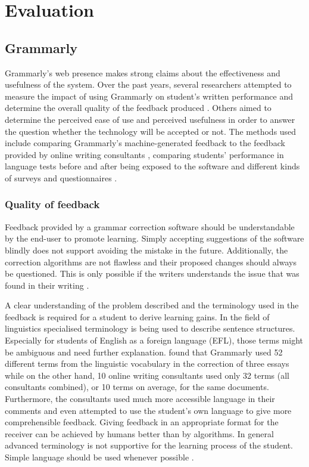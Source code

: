 \documentclass[runningheads]{llncs}
\let\OldTextregistered\textregistered
\renewcommand{\textregistered}{\OldTextregistered\xspace}%
\begin{document}
\section{Evaluation}

\subsection{Grammarly\textregistered}
Grammarly\textregistered's web presence \citep{noauthor_write_nodate} makes strong claims about the effectiveness and usefulness of the system. Over the past years, several researchers attempted to measure the impact of using Grammarly\textregistered on student's written performance and determine the overall quality of the feedback produced \citep{dembsey_closing_2017,nova_utilizing_2018,ventayen_graduate_2018}. Others \citep{cavaleri_you_2016} aimed to determine the perceived ease of use and perceived usefulness in order to answer the question whether the technology will be accepted or not. The methods used include comparing Grammarly\textregistered's machine-generated feedback to the feedback provided by online writing consultants \citep{dembsey_closing_2017}, comparing students' performance in language tests before and after being exposed to the software \citep{qassemzadeh_impact_2016} and different kinds of surveys and questionnaires \citep{nova_utilizing_2018, cavaleri_you_2016, ventayen_graduate_2018}.

\subsubsection{Quality of feedback}
Feedback provided by a grammar correction software should be understandable by the end-user to promote learning. Simply accepting suggestions of the software blindly does not support avoiding the mistake in the future. Additionally, the correction algorithms are not flawless and their proposed changes should always be questioned. This is only possible if the writers understands the issue that was found in their writing \citep{dembsey_closing_2017}.

A clear understanding of the problem described and the terminology used in the feedback is required for a student to derive learning gains. In the field of linguistics specialised terminology is being used to describe sentence structures. Especially for students of English as a foreign language (EFL), those terms might be ambiguous and need further explanation. \textcite{dembsey_closing_2017} found that Grammarly\textregistered used 52 different terms from the linguistic vocabulary in the correction of three essays while on the other hand, 10 online writing consultants used only 32 terms (all consultants combined), or 10 terms on average, for the same documents. Furthermore, the consultants used much more accessible language in their comments and even attempted to use the student's own language to give more comprehensible feedback. Giving feedback in an appropriate format for the receiver can be achieved by humans better than by algorithms. In general advanced terminology is not supportive for the learning process of the student. Simple language should be used whenever possible \citep{dembsey_closing_2017}.
\end{document}
